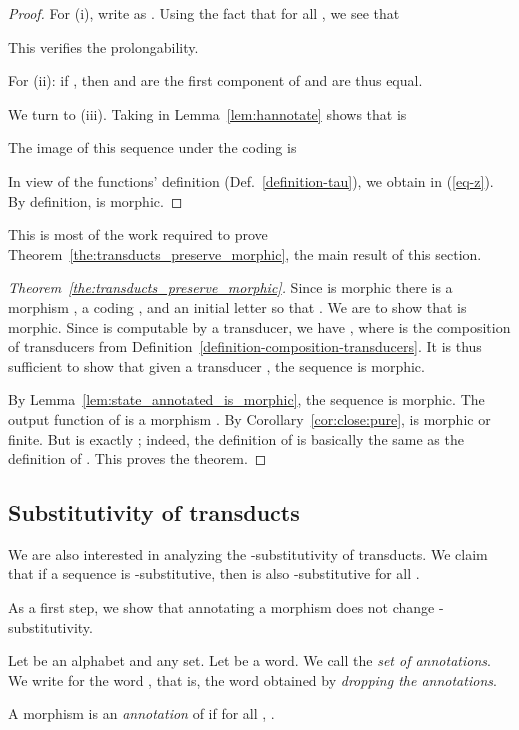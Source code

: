 \begin{proof}
For (i),   write  as .
Using the fact that  for all , we see that

This verifies the prolongability.

For (ii): if ,
  then  and  are the first component of  and are thus equal.



We turn to (iii).
Taking  in Lemma~\ref{lem:hannotate} shows that   is

The image of this sequence under the coding  is 

In view of the   functions' definition (Def.~\ref{definition-tau}), we obtain  in
 (\ref{eq-z}).
By definition,    is   morphic. 
\end{proof}

This is most of the work required to prove
Theorem~\ref{the:transducts_preserve_morphic},
 the main result of this section. 
 
\begin{proof}[Theorem~\ref{the:transducts_preserve_morphic}]  
  Since  is morphic there is a morphism , a coding , 
  and an initial letter  so that .   We are to show that 
  is morphic.    Since  is computable by a transducer, we have
  , where  is the composition of transducers from Definition~\ref{definition-composition-transducers}.
  It is thus sufficient to show that given a transducer , the sequence  is morphic.
  
  By Lemma~\ref{lem:state_annotated_is_morphic}, the sequence 
   is morphic. 
  The output function of  is a morphism  .  By 
  Corollary~\ref{cor:close:pure},
 is morphic or finite.   But   is exactly ; indeed, the definition of  is  
  basically the same as the definition of .  This proves the theorem.
\end{proof}



\subsection{Substitutivity of transducts}

We are also interested in analyzing the -substitutivity of transducts. 
We claim that if a sequence  is -substitutive, then  is also -substitutive for all . 

As a first step, we show that annotating a morphism does not change -substitutivity.
\begin{definition}
  Let  be an alphabet and  any set.
  Let  be a word.
  We call  the \emph{set of annotations}.
  We write  for the word ,
  that is, the word obtained by \emph{dropping the annotations}.

  A morphism 
  is an \emph{annotation} of 
  if  for all , .
\end{definition}


